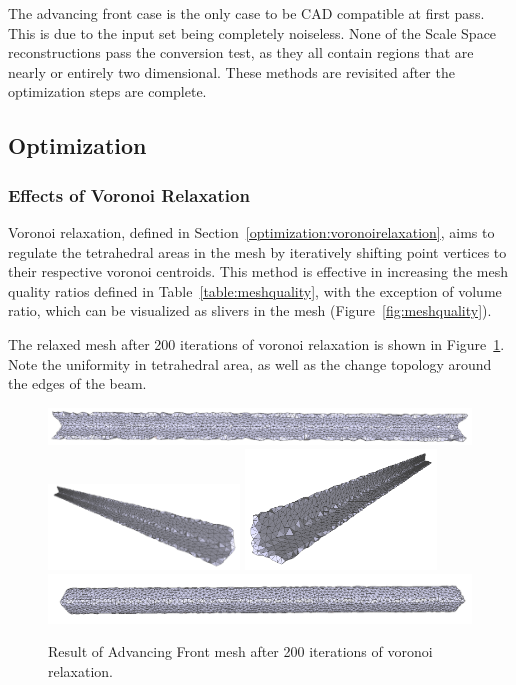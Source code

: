 \documentclass[12pt]{drexelthesis}
\let\Oldsubsection\subsection
\renewcommand{\subsection}{\FloatBarrier\Oldsubsection}
\let\Oldsubsubsection\subsubsection
\renewcommand{\subsubsection}{\FloatBarrier\Oldsubsubsection}
\begin{document}
The advancing front case is the only case to be CAD compatible at first pass. This is due to the input set being completely noiseless. None of the Scale Space reconstructions pass the conversion test, as they all contain regions that are nearly or entirely two dimensional. These methods are revisited after the optimization steps are complete.

\subsection{Optimization}
\subsubsection{Effects of Voronoi Relaxation}

Voronoi relaxation, defined in Section~\ref{optimization:voronoirelaxation}, aims to regulate the tetrahedral areas in the mesh by iteratively shifting point vertices to their respective voronoi centroids. This method is effective in increasing the mesh quality ratios defined in Table~\ref{table:meshquality}, with the exception of volume ratio, which can be visualized as slivers in the mesh (Figure~\ref{fig:meshquality}).

The relaxed mesh after 200 iterations of voronoi relaxation is shown in Figure~\ref{zeronoise:advancedlloyd}. Note the uniformity in tetrahedral area, as well as the change topology around the edges of the beam.

\begin{figure}[!ht]
	\centering
		\includegraphics[width=5in]{simulated-lab-scan/0noise/optimizedNeat/advancingfrontlloyd00.png}
		\includegraphics[width=2in]{simulated-lab-scan/0noise/optimizedNeat/advancingfrontlloyd01.png}
		\includegraphics[width=2in]{simulated-lab-scan/0noise/optimizedNeat/advancingfrontlloyd02.png}
		\includegraphics[width=5in]{simulated-lab-scan/0noise/optimizedNeat/advancingfrontlloyd03.png}
		\caption[Advancing Front mesh after 200 iterations of voronoi relaxation]{\centering  Result of Advancing Front mesh after 200 iterations of voronoi relaxation.}
	\label{zeronoise:advancedlloyd}
\end{figure}
\end{document}
